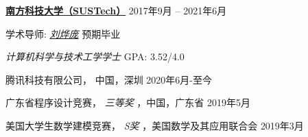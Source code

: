 \documentclass[10pt,a4paper]{article}
\begin{document}


\spacedhrule{0em}{-0.4em}


\nopagebreak[4]
  \begin{indentsection}
    \item[]
    \href{https://www.sustech.edu.cn/}{\textbf{南方科技大学（SUSTech）}}
    \hfill{2017年9月 -- 2021年6月}
    \item[]
    学术导师: \href{https://yepangliu.github.io}{\textit{刘烨庞}}
    \hfill{预期毕业}
    \item[]
    \textit{计算机科学与技术工学学士}
    \hfill{{GPA: 3.52/4.0}}
  \end{indentsection}
\nopagebreak[4]

\spacedhrule{0.5em}{-0.4em}


\nopagebreak[4]
  \begin{indentsection}
    \item[]
    腾讯科技有限公司，
    中国，深圳
    \hfill{2020年6月-至今}
  \end{indentsection}
\nopagebreak[4]

\spacedhrule{0.5em}{-0.4em}


\nopagebreak[4]
  \begin{indentsection}
    \item[]
    广东省程序设计竞赛，
    \textit{三等奖}
    ，中国，广东省
    \hfill{2019年5月}
  \end{indentsection}
\nopagebreak[4]

\nopagebreak[4]
  \begin{indentsection}
    \item[]
    美国大学生数学建模竞赛，
    \textit{S奖}
    ，美国数学及其应用联合会
    \hfill{2019年3月}
  \end{indentsection}
\nopagebreak[4]

\spacedhrule{0.5em}{-0.4em}


\end{document}

